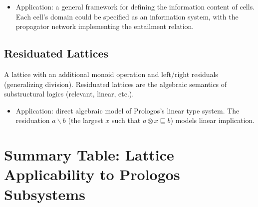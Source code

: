 \documentclass[11pt]{article}
\begin{document}
\begin{itemize}
\item Application: a general framework for defining the information content of
cells. Each cell's domain could be specified as an information system, with
the propagator network implementing the entailment relation.
\end{itemize}
\subsection{Residuated Lattices}
\label{sec:org02e3b26}

A lattice with an additional monoid operation and left/right residuals
(generalizing division). Residuated lattices are the algebraic semantics of
substructural logics (relevant, linear, etc.).

\begin{itemize}
\item Application: direct algebraic model of Prologos's linear type system. The
residuation \(a \backslash b\) (the largest \(x\) such that \(a \otimes x
  \sqsubseteq b\)) models linear implication.
\end{itemize}
\section{Summary Table: Lattice Applicability to Prologos Subsystems}
\label{sec:org19c3dfa}
\end{document}
